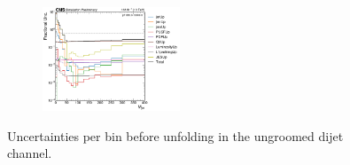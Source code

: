 \begin{figure}[ht!]
\begin{subfigure}
\end{subfigure}
  \begin{subfigure}
    \centering
    \includegraphics[width=0.45\textwidth]{figures/multijet/dijet/fracUnc_ungroomed_4.pdf}
\end{subfigure}
  \caption{Uncertainties per bin before unfolding in the ungroomed dijet channel.}
  \label{fig:dijetunc_ungroomed}
  \end{figure}
